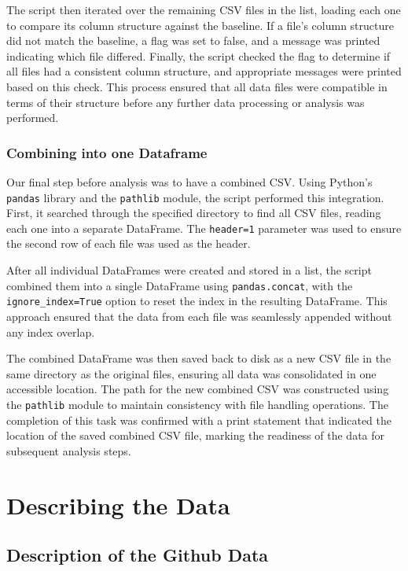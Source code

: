\documentclass[
]{article}
\begin{document}
The script then iterated over the remaining CSV files in the list,
loading each one to compare its column structure against the baseline.
If a file's column structure did not match the baseline, a flag was set
to false, and a message was printed indicating which file differed.
Finally, the script checked the flag to determine if all files had a
consistent column structure, and appropriate messages were printed based
on this check. This process ensured that all data files were compatible
in terms of their structure before any further data processing or
analysis was performed.

\subsubsection{Combining into one
Dataframe}\label{combining-into-one-dataframe}

Our final step before analysis was to have a combined CSV. Using
Python's \texttt{pandas} library and the \texttt{pathlib} module, the
script performed this integration. First, it searched through the
specified directory to find all CSV files, reading each one into a
separate DataFrame. The \texttt{header=1} parameter was used to ensure
the second row of each file was used as the header.

After all individual DataFrames were created and stored in a list, the
script combined them into a single DataFrame using
\texttt{pandas.concat}, with the \texttt{ignore\_index=True} option to
reset the index in the resulting DataFrame. This approach ensured that
the data from each file was seamlessly appended without any index
overlap.

The combined DataFrame was then saved back to disk as a new CSV file in
the same directory as the original files, ensuring all data was
consolidated in one accessible location. The path for the new combined
CSV was constructed using the \texttt{pathlib} module to maintain
consistency with file handling operations. The completion of this task
was confirmed with a print statement that indicated the location of the
saved combined CSV file, marking the readiness of the data for
subsequent analysis steps.

\section{Describing the Data}\label{describing-the-data}

\subsection{Description of the Github
Data}\label{description-of-the-github-data}
\end{document}
